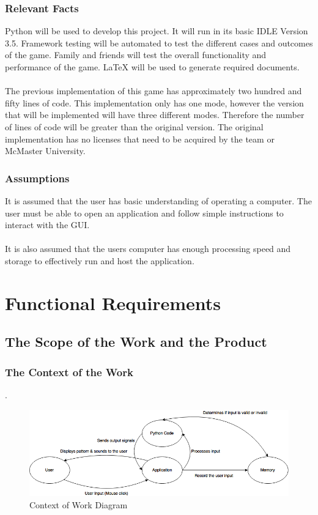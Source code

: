 \documentclass[12pt, titlepage]{article}
\begin{document}
\subsubsection{Relevant Facts}

Python will be used to develop this project. It will run in its basic IDLE Version 3.5. Framework testing will be automated to test the different cases and outcomes of the game. Family and friends will test the overall functionality and performance of the game. LaTeX will be used to generate required documents.\\
\\
The previous implementation of this game has approximately two hundred and fifty lines of code. This implementation only has one mode, however the version that will be implemented will have three different modes. Therefore the number of lines of code will be greater than the original version. The original implementation has no licenses that need to be acquired by the team or McMaster University.

\subsubsection{Assumptions}
It is assumed that the user has basic understanding of operating a computer. The user must be able to open an application and follow simple instructions to interact with the GUI.\\
\\
It is also assumed that the users computer has enough processing speed and storage to effectively run and host the application.

\section{Functional Requirements}
\subsection{The Scope of the Work and the Product}

\subsubsection{The Context of the Work}
.
\begin {figure}[h]
	\includegraphics [width = \linewidth] {Context_Of_Work.png}
	\caption {Context of Work Diagram}
	\label {Figure: Context of Work}
\end {figure}
\end{document}

